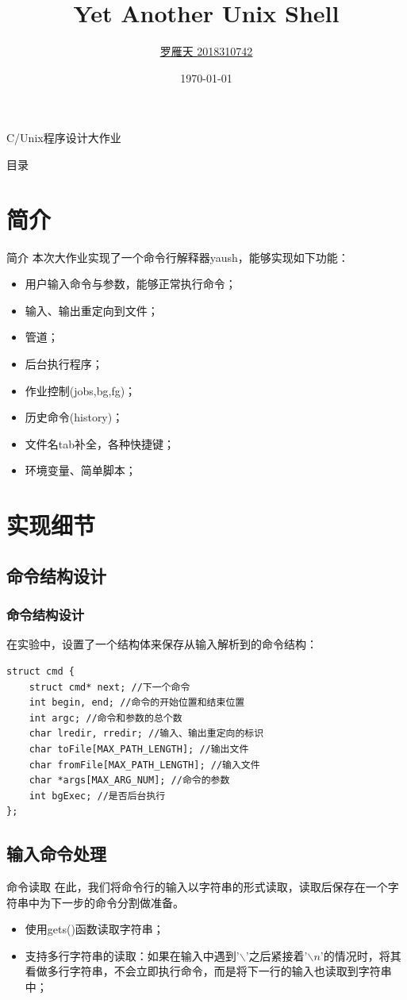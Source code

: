 \documentclass[10pt]{beamer}
\title{Yet Another Unix Shell }
\author{\href{mailto:luoyt14thu@gmail.com}{罗雁天 2018310742}}
\date{\today}
\begin{document}
\begin{frame}{C/Unix程序设计大作业}
\titlepage
\end{frame}

\begin{frame}{目录}
\tableofcontents
\end{frame}

\section{简介}

\begin{frame}{简介}
本次大作业实现了一个命令行解释器yaush，能够实现如下功能：

\begin{itemize}
	\item 用户输入命令与参数，能够正常执行命令；
	\item 输入、输出重定向到文件；
	\item 管道；
	\item 后台执行程序；
	\item 作业控制(jobs,bg,fg)；
	\item 历史命令(history)；
	\item 文件名tab补全，各种快捷键；
	\item 环境变量、简单脚本；
\end{itemize}
\end{frame}

\section{实现细节}
\subsection{命令结构设计}
\begin{frame}[fragile]
\frametitle{命令结构设计}
在实验中，设置了一个结构体来保存从输入解析到的命令结构：
\begin{lstlisting}
struct cmd {
    struct cmd* next; //下一个命令
    int begin, end; //命令的开始位置和结束位置
    int argc; //命令和参数的总个数
    char lredir, rredir; //输入、输出重定向的标识
    char toFile[MAX_PATH_LENGTH]; //输出文件
    char fromFile[MAX_PATH_LENGTH]; //输入文件
    char *args[MAX_ARG_NUM]; //命令的参数
    int bgExec; //是否后台执行
};
\end{lstlisting}
\end{frame}

\subsection{输入命令处理}
\begin{frame}{命令读取}
在此，我们将命令行的输入以字符串的形式读取，读取后保存在一个字符串中为下一步的命令分割做准备。
\begin{itemize}
	\item 使用gets()函数读取字符串；
	\item 支持多行字符串的读取：如果在输入中遇到'$\backslash$'之后紧接着'$\backslash n$'的情况时，将其看做多行字符串，不会立即执行命令，而是将下一行的输入也读取到字符串中；
\end{itemize}
\end{frame}
\end{document}
